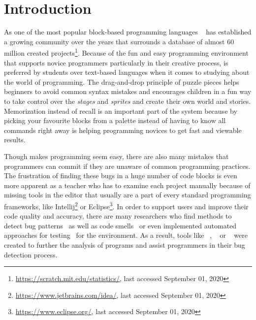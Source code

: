 \chapter{Introduction}\label{chap:introduction}

As one of the most popular block-based programming languages \scratch{}~\cite{scratch} has established a growing community over the years that surrounds a database of almost 60 million created projects\footnote{\url{https://scratch.mit.edu/statistics/}, last accessed September 01, 2020}. Because of the fun and easy programming environment that supports novice programmers particularly in their creative process, \scratch{} is preferred by students over text-based languages when it comes to studying about the world of programming. The drag-and-drop principle of puzzle pieces helps beginners to avoid common syntax mistakes and encourages children in a fun way to take control over the \textit{stages} and \textit{sprites} and create their own world and stories. Memorization instead of recall is an important part of the \scratch{} system because by picking your favourite blocks from a palette instead of having to know all commands right away is helping programming novices to get fast and viewable results. 

Though \scratch{} makes programming seem easy, there are also many mistakes that programmers can commit if they are unaware of common programming practices. The frustration of finding these bugs in a huge number of code blocks is even more apparent as a teacher who has to examine each project manually because of missing tools in the \scratch{} editor that usually are a part of every standard programming frameworks, like Intellij\footnote{\url{https://www.jetbrains.com/idea/}, last accessed September 01, 2020} or Eclipse\footnote{\url{https://www.eclipse.org/}, last accessed September 01, 2020}. In order to support \scratch{} users and improve their code quality and accuracy, there are many researchers who find methods to detect bug patterns~\cite{scratch_bugpatterns} as well as code smells~\cite{badsmells, badhabits, hairball} or even implemented automated approaches for testing~\cite{whisker} for the \scratch{} environment. As a result, tools like \hairball~\cite{hairball}, \drscratch~\cite{drscratch} or \litterbox~\cite{scratch_bugpatterns} were created to further the analysis of \scratch{} programs and assist programmers in their bug detection process.

